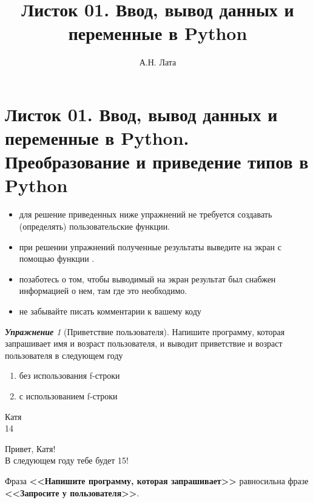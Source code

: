 \documentclass[a4,12pt]{article}
\title{Листок 01. Ввод, вывод данных и переменные в Python}
\author{А.Н. Лата}
\theoremstyle{remark}
\newtheorem{exercise}{\textbf{Упражнение}}[section]
\begin{document}

\section*{\centering Листок 01. Ввод, вывод данных и переменные в Python. Преобразование и приведение типов в Python}

\begin{exercisenote}[title=Замечания]
\begin{itemize}
    \item для решение приведенных ниже упражнений не требуется создавать (определять) пользовательские функции.
    \item при решении упражнений полученные результаты выведите на экран с помощью функции {\color{blue}{print()}}.
    \item позаботесь о том, чтобы выводимый на экран результат был снабжен информацией о нем, там где это необходимо.
    \item не забывайте писать комментарии к вашему коду
\end{itemize}
\end{exercisenote}


\begin{exercise}[Приветствие пользователя]
Напишите программу, которая запрашивает имя и возраст пользователя, и выводит приветствие и возраст пользователя в следующем году
\begin{enumerate}[label=\textbf{\alph*)}]
    \item без использования f-строки
    \item с использованием f-строки
\end{enumerate}

\begin{inputformat}
Катя\\
14
\end{inputformat}
    
\begin{outputformat}
Привет, Катя!\\
В следующем году тебе будет 15!
\end{outputformat}

\begin{exercisecomment}
Фраза \textbf{<<Напишите программу, которая запрашивает>>} равносильна фразе \textbf{<<Запросите у пользователя>>}.
\end{exercisecomment}

\end{exercise}
\end{document}
